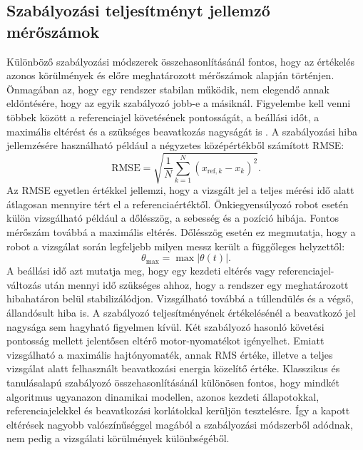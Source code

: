 \documentclass[12pt,a4paper]{report}
\begin{document}
	\subsection{Szabályozási teljesítményt jellemző mérőszámok}
	Különböző szabályozási módszerek összehasonlításánál fontos, hogy az értékelés azonos körülmények és előre meghatározott mérőszámok alapján történjen. Önmagában az, hogy egy rendszer stabilan működik, nem elegendő annak eldöntésére, hogy az egyik szabályozó jobb-e a másiknál. Figyelembe kell venni többek között a referenciajel követésének pontosságát, a beállási időt, a maximális eltérést és a szükséges beavatkozás nagyságát is \cite{zhangnor2025}.
	\newline
	\newline
	A szabályozási hiba jellemzésére használható például a négyzetes középértékből számított RMSE:
	\begin{equation}
		\mathrm{RMSE}
		=
		\sqrt{
			\frac{1}{N}
			\sum_{k=1}^{N}
			\left(
			x_{\mathrm{ref},k}-x_k
			\right)^2
		}.
	\end{equation}
	Az RMSE egyetlen értékkel jellemzi, hogy a vizsgált jel a teljes mérési idő alatt átlagosan mennyire tért el a referenciaértéktől. Önkiegyensúlyozó robot esetén külön vizsgálható például a dőlésszög, a sebesség és a pozíció hibája.
	\newline
	\newline
	Fontos mérőszám továbbá a maximális eltérés. Dőlésszög esetén ez megmutatja, hogy a robot a vizsgálat során legfeljebb milyen messz került a függőleges helyzettől:
	\begin{equation}
		\theta_{\max}
		=
		\max |\theta(t)|.
	\end{equation}
	A beállási idő azt mutatja meg, hogy egy kezdeti eltérés vagy referenciajel-változás után mennyi idő szükséges ahhoz, hogy a rendszer egy meghatározott hibahatáron belül stabilizálódjon. Vizsgálható továbbá a túllendülés és a végső, állandósult hiba is.
	\newline
	\newline
	A szabályozó teljesítményének értékelésénél a beavatkozó jel nagysága sem hagyható figyelmen kívül. Két szabályozó hasonló követési pontosság mellett jelentősen eltérő motor-nyomatékot igényelhet. Emiatt vizsgálható a maximális hajtónyomaték, annak RMS értéke, illetve a teljes vizsgálat alatt felhasznált beavatkozási energia közelítő értéke.
	\newline
	\newline
	Klasszikus és tanulásalapú szabályozó összehasonlításánál különösen fontos, hogy mindkét algoritmus ugyanazon dinamikai modellen, azonos kezdeti állapotokkal, referenciajelekkel és beavatkozási korlátokkal kerüljön tesztelésre. Így a kapott eltérések nagyobb valószínűséggel magából a szabályozási módszerből adódnak, nem pedig a vizsgálati körülmények különbségéből.
\end{document}
